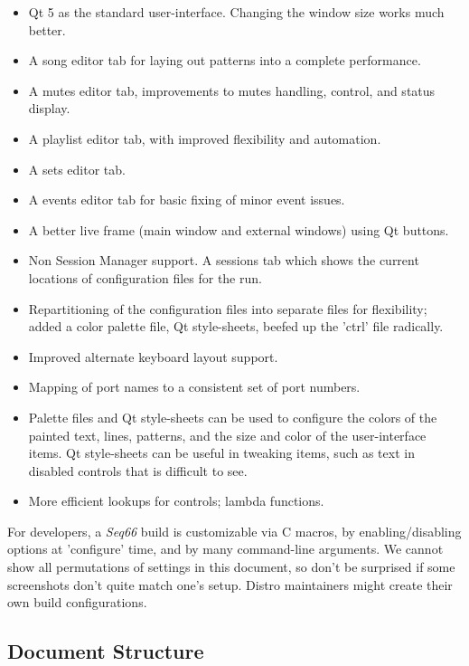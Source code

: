 \documentclass[
 11pt,
 twoside,
 a4paper,
 final                                 %
]{article}
\begin{document}
   \begin{itemize}
      \item Qt 5 as the standard user-interface. Changing the window size works
         much better.
      \item A song editor tab for laying out patterns into a complete
         performance.
      \item A mutes editor tab, improvements to mutes handling, control, and
         status display.
      \item A playlist editor tab, with improved flexibility and automation.
      \item A sets editor tab.
      \item A events editor tab for basic fixing of minor event issues.
      \item A better live frame (main window and external windows) using
         Qt buttons.
      \item Non Session Manager support. A sessions tab which shows the current
         locations of configuration files for the run.
      \item Repartitioning of the configuration files into separate files for
         flexibility; added a color palette file, Qt style-sheets, beefed up the
         'ctrl' file radically.
      \item Improved alternate keyboard layout support.
      \item Mapping of port names to a consistent set of port numbers.
      \item Palette files and Qt style-sheets can be used to configure the colors
         of the painted text, lines, patterns, and the size and color of
         the user-interface items.
         Qt style-sheets can be useful in tweaking items, such as text in
         disabled controls that is difficult to see.
      \item More efficient lookups for controls; lambda functions.
   \end{itemize}

   For developers, a \textsl{Seq66} build is customizable via C macros,
   by enabling/disabling options at 'configure' time, and by many
   command-line arguments.  We cannot show all permutations of settings in this
   document, so don't be surprised if some screenshots don't quite match
   one's setup.  Distro maintainers might create their own build
   configurations.

\subsection{Document Structure}
\label{subsec:introduction_document_structure}
\end{document}
